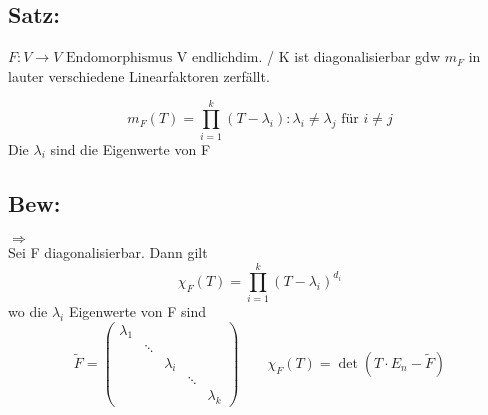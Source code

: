 \documentclass[titlepage,12pt,a4paper,ngerman]{report}
\newcommand{\tx}[1]{\textrm{#1}}
\newcommand{\enph}{F: V \to V \textrm{ Endomorphismus}}
\begin{document}
\subsection{Satz:}
$\enph$ V endlichdim. / K ist diagonalisierbar gdw $m_F$ in lauter verschiedene Linearfaktoren zerfällt.

$$m_F(T) = \prod_{i=1}^{k} (T-\lambda_i) : \lambda_i \neq \lambda_j \tx{ für } i\neq j $$
Die $\lambda_i$ sind die Eigenwerte von F
\subsection{Bew:}
$ \boxed{\Rightarrow} $\\
Sei F diagonalisierbar. Dann gilt 
$$\chi_F(T) = \prod_{i=1}^{k} (T-\lambda_i)^{d_i}$$
wo die $ \lambda_i $ Eigenwerte von F sind
$$ \tilde{F} = \begin{pmatrix}
\lambda_1 \\
& \ddots\\
& & \lambda_i \\
& & & \ddots\\
& & & & \lambda_k
\end{pmatrix} \qquad \chi_F(T) = \det(T\cdot E_n - \tilde{F})$$
\end{document}
